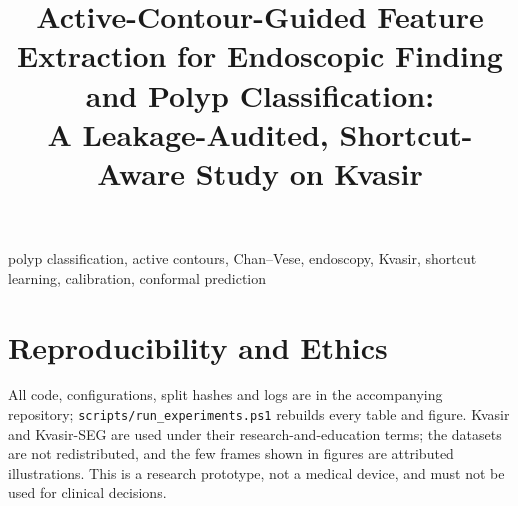\documentclass[conference]{IEEEtran}
\begin{document}
\title{Active-Contour-Guided Feature Extraction for Endoscopic Finding and Polyp Classification:\\ A Leakage-Audited, Shortcut-Aware Study on Kvasir}
\author{%
\and
{}
\and
{}
}
\maketitle


\begin{IEEEkeywords}
polyp classification, active contours, Chan--Vese, endoscopy, Kvasir, shortcut learning, calibration, conformal prediction
\end{IEEEkeywords}








\section*{Reproducibility and Ethics}
All code, configurations, split hashes and logs are in the accompanying repository; \texttt{scripts/run\_experiments.ps1}
rebuilds every table and figure. Kvasir and Kvasir-SEG are used under their research-and-education terms; the datasets are not redistributed, and the few frames shown in figures are attributed illustrations.
This is a research prototype, not a medical device, and must not be used for clinical decisions.



\end{document}
